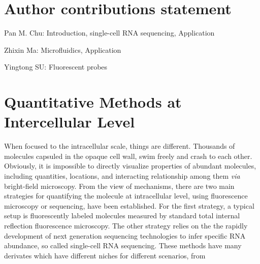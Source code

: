 \documentclass[fleqn,10pt]{wlscirep}
\begin{document}





\section*{Author contributions statement}

Pan M. Chu: Introduction, single-cell RNA sequencing, Application

Zhixin Ma: Microfluidics, Application

Yingtong SU: Fluorescent probes

\section[]{Quantitative Methods at Intercellular Level}

When focused to the intracellular scale, things are different. Thousands of molecules capsuled in the opaque cell wall, swim freely and crash to each other. Obviously, it is impossible to directly visualize properties of abundant molecules, including quantities, locations, and interacting relationship among them \emph{via} bright-field microscopy. From the view of mechanisms, there are two main strategies for quantifying the molecule at intracellular level, using fluorescence microscopy or sequencing, have been established. For the first strategy, a typical setup is fluorescently labeled molecules measured by standard total internal reflection fluorescence microscopy. The other strategy relies on the the rapidly development of next generation sequencing technologies to infer specific RNA abundance, so called single-cell RNA sequencing. These methods have many derivates which have different niches for different scenarios, from 




\end{document}
